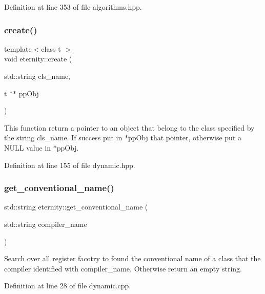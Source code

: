 Definition at line 353 of file algorithms.\+hpp.

\mbox{\label{namespaceeternity_a18dc40145658dda3be79014257e1176b}} 
\subsubsection{\texorpdfstring{create()}{create()}}
{\footnotesize\ttfamily template$<$class t $>$ \\
void eternity\+::create (\begin{DoxyParamCaption}\item[{std\+::string}]{cls\+\_\+name,  }\item[{t $\ast$$\ast$}]{pp\+Obj }\end{DoxyParamCaption})}

This function return a pointer to an object that belong to the class specified by the string cls\+\_\+name. If success put in $\ast$pp\+Obj that pointer, otherwise put a N\+U\+LL value in $\ast$pp\+Obj. 

Definition at line 155 of file dynamic.\+hpp.

\mbox{\label{namespaceeternity_a5f792170a26f719b53ffeb502cdd2344}} 
\subsubsection{\texorpdfstring{get\+\_\+conventional\+\_\+name()}{get\_conventional\_name()}}
{\footnotesize\ttfamily std\+::string eternity\+::get\+\_\+conventional\+\_\+name (\begin{DoxyParamCaption}\item[{std\+::string}]{compiler\+\_\+name }\end{DoxyParamCaption})}

Search over all register facotry to found the conventional name of a class that the compiler identified with compiler\+\_\+name. Otherwise return an empty string. 

Definition at line 28 of file dynamic.\+cpp.

\mbox{\label{namespaceeternity_acbfdd0b95d15efaa347565f99effa8c3}} 
